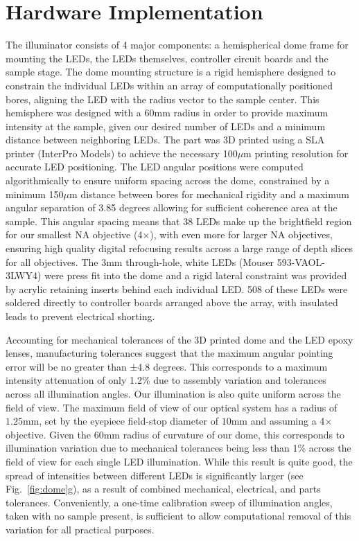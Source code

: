 \section{Hardware Implementation}
The illuminator consists of 4 major components: a hemispherical dome frame for mounting the LEDs, the LEDs themselves, controller circuit boards and the sample stage. The dome mounting structure is a rigid hemisphere designed to constrain the individual LEDs within an array of computationally positioned bores, aligning the LED with the radius vector to the sample center.  This hemisphere was designed with a $60\textrm{mm}$ radius in order to provide maximum intensity at the sample, given our desired number of LEDs and a minimum distance between neighboring LEDs. The part was 3D printed using a SLA printer (InterPro Models) to achieve the necessary 100$\mu$m printing resolution for accurate LED positioning. The LED angular positions were computed algorithmically to ensure uniform spacing across the dome, constrained by a minimum 150$\mu$m distance between bores for mechanical rigidity and a maximum angular separation of 3.85 degrees allowing for sufficient coherence area at the sample. This angular spacing means that 38 LEDs make up the brightfield region for our smallest NA objective (4$\times$), with even more for larger NA objectives, ensuring high quality digital refocusing results across a large range of depth slices for all objectives. The $3\textrm{mm}$ through-hole, white LEDs (Mouser 593-VAOL-3LWY4) were press fit into the dome and a rigid lateral constraint was provided by acrylic retaining inserts behind each individual LED. 508 of these LEDs were soldered directly to controller boards arranged above the array, with insulated leads to prevent electrical shorting.

Accounting for mechanical tolerances of the 3D printed dome and the LED epoxy lenses, manufacturing tolerances suggest that the maximum angular pointing error will be no greater than ±4.8 degrees. This corresponds to a maximum intensity attenuation of only 1.2\% due to assembly variation and tolerances across all illumination angles. Our illumination is also quite uniform across the field of view. The maximum field of view of our optical system has a radius of $1.25\textrm{mm}$, set by the eyepiece field-stop diameter of $10\textrm{mm}$ and assuming a 4$\times$ objective. Given the $60\textrm{mm}$ radius of curvature of our dome, this corresponds to illumination variation due to mechanical tolerances being less than 1\% across the field of view for each single LED illumination.  While this result is quite good, the spread of intensities between different LEDs is significantly larger (see Fig.~\ref{fig:dome}g), as a result of combined mechanical, electrical, and parts tolerances. Conveniently, a one-time calibration sweep of illumination angles, taken with no sample present, is sufficient to allow computational removal of this variation for all practical purposes.

